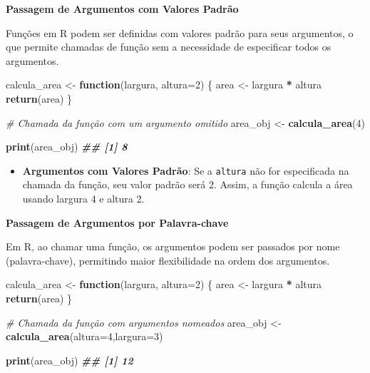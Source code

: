 \documentclass[
]{book}
\newenvironment{Shaded}{\begin{snugshade}}{\end{snugshade}}
\newcommand{\AttributeTok}[1]{\textcolor[rgb]{0.13,0.29,0.53}{#1}}
\newcommand{\CommentTok}[1]{\textcolor[rgb]{0.56,0.35,0.01}{\textit{#1}}}
\newcommand{\ControlFlowTok}[1]{\textcolor[rgb]{0.13,0.29,0.53}{\textbf{#1}}}
\newcommand{\DecValTok}[1]{\textcolor[rgb]{0.00,0.00,0.81}{#1}}
\newcommand{\DocumentationTok}[1]{\textcolor[rgb]{0.56,0.35,0.01}{\textbf{\textit{#1}}}}
\newcommand{\FunctionTok}[1]{\textcolor[rgb]{0.13,0.29,0.53}{\textbf{#1}}}
\newcommand{\NormalTok}[1]{#1}
\newcommand{\OtherTok}[1]{\textcolor[rgb]{0.56,0.35,0.01}{#1}}
\newcommand{\SpecialCharTok}[1]{\textcolor[rgb]{0.81,0.36,0.00}{\textbf{#1}}}
\providecommand{\tightlist}{%
  \setlength{\itemsep}{0pt}\setlength{\parskip}{0pt}}
\begin{document}
\textbf{Passagem de Argumentos com Valores Padrão}

Funções em R podem ser definidas com valores padrão para seus
argumentos, o que permite chamadas de função sem a necessidade de
especificar todos os argumentos.

\begin{Shaded}
\begin{Highlighting}[]
\NormalTok{calcula\_area }\OtherTok{\textless{}{-}} \ControlFlowTok{function}\NormalTok{(largura, }\AttributeTok{altura=}\DecValTok{2}\NormalTok{) \{ }
\NormalTok{  area }\OtherTok{\textless{}{-}}\NormalTok{ largura }\SpecialCharTok{*}\NormalTok{ altura  }
  \FunctionTok{return}\NormalTok{(area)}
\NormalTok{\}}

\CommentTok{\# Chamada da função com um argumento omitido}
\NormalTok{area\_obj }\OtherTok{\textless{}{-}} \FunctionTok{calcula\_area}\NormalTok{(}\DecValTok{4}\NormalTok{) }

\FunctionTok{print}\NormalTok{(area\_obj)}
\DocumentationTok{\#\# [1] 8}
\end{Highlighting}
\end{Shaded}

\begin{itemize}
\tightlist
\item
  \textbf{Argumentos com Valores Padrão}: Se a \texttt{altura} não for
  especificada na chamada da função, seu valor padrão será 2. Assim, a
  função calcula a área usando largura 4 e altura 2.
\end{itemize}

\textbf{Passagem de Argumentos por Palavra-chave}

Em R, ao chamar uma função, os argumentos podem ser passados por nome
(palavra-chave), permitindo maior flexibilidade na ordem dos argumentos.

\begin{Shaded}
\begin{Highlighting}[]
\NormalTok{calcula\_area }\OtherTok{\textless{}{-}} \ControlFlowTok{function}\NormalTok{(largura, }\AttributeTok{altura=}\DecValTok{2}\NormalTok{) \{ }
\NormalTok{        area }\OtherTok{\textless{}{-}}\NormalTok{ largura }\SpecialCharTok{*}\NormalTok{ altura  }
        \FunctionTok{return}\NormalTok{(area)}
\NormalTok{\}}

\CommentTok{\# Chamada da função com argumentos nomeados}
\NormalTok{area\_obj }\OtherTok{\textless{}{-}} \FunctionTok{calcula\_area}\NormalTok{(}\AttributeTok{altura=}\DecValTok{4}\NormalTok{,}\AttributeTok{largura=}\DecValTok{3}\NormalTok{) }
    
\FunctionTok{print}\NormalTok{(area\_obj)}
\DocumentationTok{\#\# [1] 12}
\end{Highlighting}
\end{Shaded}
\end{document}

